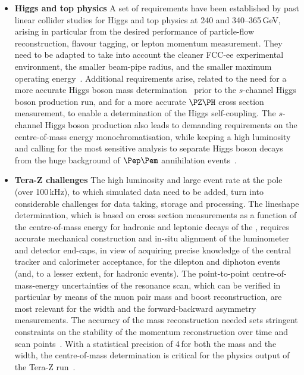 \begin{itemize}
\item {\bf Higgs and top physics}
A set of requirements have been established by past linear collider studies for Higgs and top physics at 240 
and 340--365\,GeV, arising in particular from the desired performance of particle-flow reconstruction, flavour tagging, or lepton momentum measurement. 
They need to be adapted to take into account the cleaner FCC-ee experimental environment, the smaller beam-pipe radius, and the smaller maximum operating energy~\cite{Azzi:2021gwg}. 
Additional requirements arise, related to the need for a more accurate Higgs boson mass determination~\cite{Azzurri:2021nmy} prior to the $s$-channel Higgs boson production run, and for a more accurate $\PZ\PH$ cross section measurement, to enable a determination of the  Higgs self-coupling. 
The $s$-channel Higgs boson production also leads to demanding requirements on the centre-of-mass energy monochromatisation, while keeping a high luminosity and calling for the most sensitive analysis to separate Higgs boson decays from the huge background of $\Pep\Pem$ annihilation events~\cite{dEnterria:2021xij}. 

\item {\bf Tera-Z challenges}
The high luminosity and large event rate at the \PZ pole (over 100\,kHz), to which simulated data need to be added, turn into considerable challenges for data taking, storage and processing. 
The \PZ lineshape determination, which is based on cross section measurements as a function of the centre-of-mass energy for hadronic and leptonic decays of the \PZ, requires accurate mechanical construction and in-situ alignment of the luminometer and detector end-caps, in view of acquiring precise knowledge of the central tracker and calorimeter acceptance, for the dilepton and diphoton events (and, to a lesser extent, for hadronic events). 
The point-to-point centre-of-mass-energy uncertainties of the resonance scan, which can be verified in particular by means of the muon pair mass and boost reconstruction, are most relevant for the \PZ width and the forward-backward asymmetry measurements. 
The accuracy of the mass reconstruction needed sets stringent constraints on the stability of the momentum reconstruction over time and scan points~\cite{Maestre:2021zvq}. 
With a statistical precision of 4\,\keV for both the \PZ mass and the \PZ width, the centre-of-mass determination is critical for the physics output of the Tera-Z run~\cite{Blondel:2019jmp,note_EPOL}.


\end{itemize}
